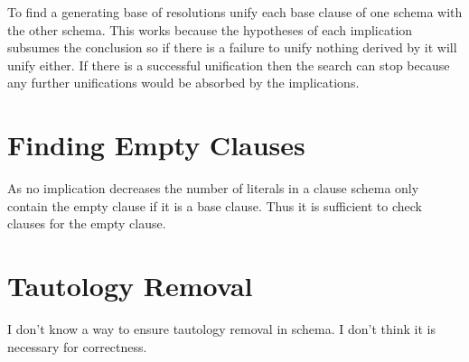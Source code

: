 \documentclass{article}
\begin{document}
          To find a generating base of resolutions unify each base clause of one schema with the other schema.
             This works because the hypotheses of each implication subsumes the conclusion so if there is a failure to unify nothing derived by it will unify either.
             If there is a successful unification then the search can stop because any further unifications would be absorbed by the implications.

\section{Finding Empty Clauses}
  As no implication decreases the number of literals in a clause schema only contain the empty clause if it is a base clause.
  Thus it is sufficient to check clauses for the empty clause.

\section{Tautology Removal}
  I don't know a way to ensure tautology removal in schema.
  I don't think it is necessary for correctness.
  
\end{document}
